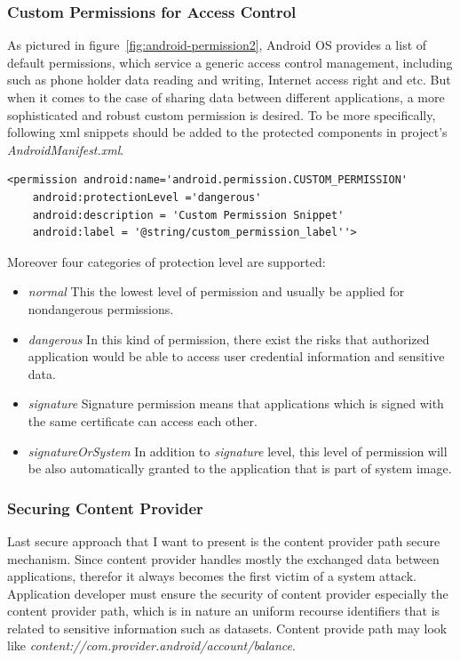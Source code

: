 \subsubsection{Custom Permissions for Access Control}

As pictured in figure~\ref{fig:android-permission2}, Android OS provides a list of default permissions, which service a generic access control management, including such as  phone  holder data reading and writing, Internet access right and etc. But when it comes to the case of sharing data between different applications, a more sophisticated and robust custom permission is desired. To be more specifically, following xml snippets should be added to the protected components in project's \emph{AndroidManifest.xml}\cite{android_secure_cook}.

\begin{Verbatim}[fontsize=\relsize{-1},frame=lines,framesep=4mm, label=\fbox{\small\emph{Custom Permission Snippet}}]
<permission android:name='android.permission.CUSTOM_PERMISSION'
	android:protectionLevel ='dangerous'
	android:description = 'Custom Permission Snippet'
	android:label = '@string/custom_permission_label''>
\end{Verbatim} 
Moreover four categories of protection level are supported\cite{android_secure_cook}:
\begin{itemize}
\item \emph{normal} This the lowest level of permission and usually be applied for nondangerous permissions. 
\item \emph{dangerous}  In this kind of permission, there exist the risks that authorized application would be able to access user credential information and sensitive data.
\item \emph{signature} Signature permission means that applications  which is signed with the same certificate can access each other.
\item \emph{signatureOrSystem} In addition to \emph{signature} level, this level of permission will be also automatically granted to the application that is part of system image.
\end{itemize}
\subsubsection{Securing Content Provider}
Last secure approach that I want to present is the content provider path  secure mechanism. Since content provider handles mostly the exchanged data between applications, therefor it always becomes the first victim of a system attack. Application developer must ensure the security of content provider especially the content  provider path, which is in nature an uniform recourse identifiers that is related  to sensitive information such as datasets\cite{android_secure_cook}. Content provide path may look like \emph{content://com.provider.android/account/balance}.

